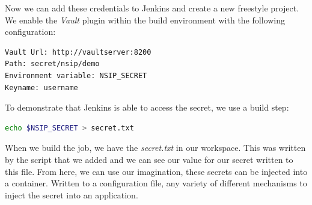 \documentclass[runningheads]{llncs}
\begin{document}
Now we can add these credentials to Jenkins and create a new freestyle project. We enable the \textit{Vault} plugin within the build environment with the following configuration:

\begin{lstlisting}[language=bash]
Vault Url: http://vaultserver:8200
Path: secret/nsip/demo
Environment variable: NSIP_SECRET
Keyname: username
\end{lstlisting}

To demonstrate that Jenkins is able to access the secret, we use a build step: 

\begin{lstlisting}[language=bash]
echo $NSIP_SECRET > secret.txt
\end{lstlisting}

When we build the job, we have the \textit{secret.txt} in our workspace. This was written by the script that we added and we can see our value for our secret written to this file. From here, we can use our imagination, these secrets can be injected into a container. Written to a configuration file, any variety of different mechanisms to inject the secret into an application.

\newpage
\end{document}
